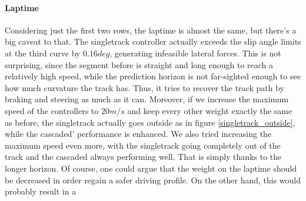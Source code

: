 \documentclass[a4paper, onecolumn, 12pt]{article}
\begin{document}
\paragraph{Laptime}
Considering just the first two rows, the laptime is almost the same, but there's
a big caveat to that. The singletrack controller actually exceeds the slip angle
limits at the third curve by $0.16 deg$, generating infeasible lateral forces.
This is not surprising, since the segment before is straight and long enough to
reach a relatively high speed, while the prediction horizon is not far-sighted
enough to see how much curvature the track has. Thus, it tries to recover the
track path by braking and steering as much as it can. Moreover, if we increase
the maximum speed of the controllers to $20 m/s$ and keep every other weight
exactly the same as before, the singletrack actually goes outside as in figure
\ref{singletrack_outside}, while the cascaded' performance is enhanced. We also
tried increasing the maximum speed even more, with the singletrack going
completely out of the track and the cascaded always performing well. That is
simply thanks to the longer horizon. Of course, one could argue that the weight
on the laptime should be decreased in order regain a safer driving profile. On
the other hand, this would probably result in a 
\end{document}
